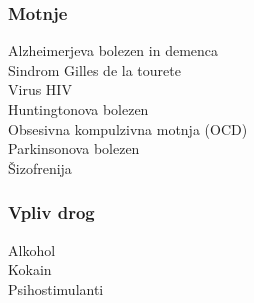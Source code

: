 \documentclass[10pt,a4paper]{article}
\begin{document}
\subsubsection{Motnje}
Alzheimerjeva bolezen in demenca\\
Sindrom Gilles de la tourete\\
Virus HIV\\
Huntingtonova bolezen\\
Obsesivna kompulzivna motnja (OCD)\\
Parkinsonova bolezen\\
Šizofrenija

\subsubsection{Vpliv drog}
Alkohol\\
Kokain\\
Psihostimulanti

\section{}
\end{document}
